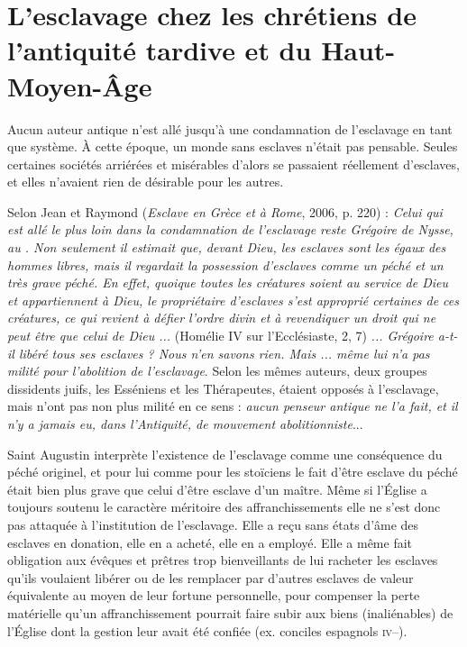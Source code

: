 
\chapter[L'esclavage chez les chrétiens de l'antiquité tardive et du Haut-Moyen-Âge]{L'esclavage chez les chrétiens de l'antiquité tardive et du Haut-Moyen-Âge}


 Aucun auteur antique n'est allé jusqu'à une condamnation de l'esclavage en tant que système. À cette époque, un monde sans esclaves n'était pas pensable. Seules certaines sociétés arriérées et misérables d'alors se passaient réellement d'esclaves, et elles n'avaient rien de désirable pour les autres. 

 Selon Jean  et Raymond  (\emph{Esclave en Grèce et à Rome}, 2006, p. 220) : \emph{Celui qui est allé le plus loin dans la condamnation de l'esclavage reste Grégoire de Nysse, au . Non seulement il estimait que, devant Dieu, les esclaves sont les égaux des hommes libres, mais il regardait la possession d'esclaves comme un péché et un très grave péché. En effet, quoique toutes les créatures soient au service de Dieu et appartiennent à Dieu, le propriétaire d'esclaves s'est approprié certaines de ces créatures, ce qui revient à défier l'ordre divin et à revendiquer un droit qui ne peut être que celui de Dieu ...} (Homélie IV sur l'Ecclésiaste, 2, 7) \emph{... Grégoire a-t-il libéré tous ses esclaves ? Nous n'en savons rien. Mais ... même lui n'a pas milité pour l'abolition de l'esclavage}. Selon les mêmes auteurs, deux groupes dissidents juifs, les Esséniens et les Thérapeutes, étaient opposés à l'esclavage, mais n'ont pas non plus milité en ce sens : \emph{aucun penseur antique ne l'a fait, et il n'y a jamais eu, dans l'Antiquité, de mouvement abolitionniste}...

 Saint Augustin interprète l'existence de l'esclavage comme une conséquence du péché originel, et pour lui comme pour les stoïciens le fait d'être esclave du péché était bien plus grave que celui d'être esclave d'un maître. Même si l'Église a toujours soutenu le caractère méritoire des affranchissements elle ne s'est donc pas attaquée à l'institution de l'esclavage. Elle a reçu sans états d'âme des esclaves en donation, elle en a acheté, elle en a employé. Elle a même fait obligation aux évêques et prêtres trop bienveillants de lui racheter les esclaves qu'ils voulaient libérer ou de les remplacer par d'autres esclaves de valeur équivalente au moyen de leur fortune personnelle, pour compenser la perte matérielle qu'un affranchissement pourrait faire subir aux biens (inaliénables) de l’Église dont la gestion leur avait été confiée (ex. conciles espagnols \textsc{iv--}). 


